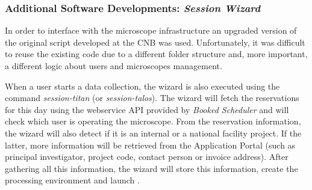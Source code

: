 \subsubsection{Additional Software Developments: \emph{Session Wizard}}
In order to interface \scipion with the microscope infrastructure an upgraded version of the original script developed at the CNB was used. Unfortunately, it was difficult to reuse the existing code due to a different folder structure and, more important, a different logic about users and microscopes management. %


When a user starts a data collection, the wizard is also executed using the command \textit{session-titan} (or \textit{session-talos}). The wizard will fetch the reservations for this day using the webservice API provided by \emph{Booked Scheduler} and will check which user is operating the microscope. From the reservation information, the wizard will also detect if it is an internal or a national facility project. If the latter, more information will be retrieved from the Application Portal (such as principal investigator, project code, contact person or invoice address). After gathering all this information, the wizard will store this information, create the processing environment and launch \scipion. %

